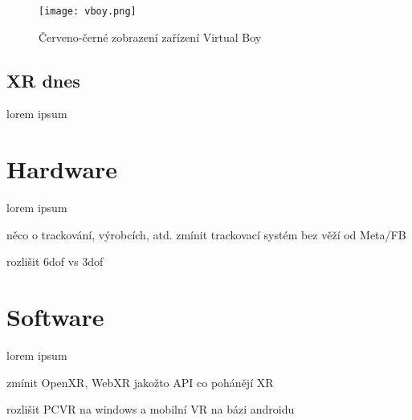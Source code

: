\begin{figure}[H]
        \centering
        \texttt{[image: vboy.png]}
        \caption{Červeno-černé zobrazení zařízení Virtual Boy \cite{vboy}}
        \label{vboy_red_display}
\end{figure}

\section{XR dnes}

lorem ipsum

\chapter{Hardware}
lorem ipsum

něco o trackování, výrobcích, atd. zmínit trackovací systém bez věží od Meta/FB

rozlišit 6dof vs 3dof

\chapter{Software}
lorem ipsum

zmínit OpenXR, WebXR jakožto API co pohánějí XR

rozlišit PCVR na windows a mobilní VR na bázi androidu